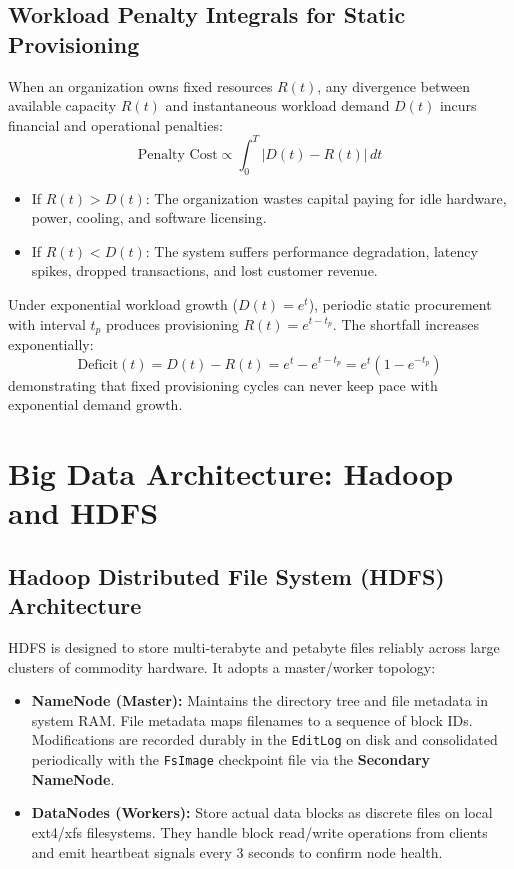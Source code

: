 \documentclass[11pt,a4paper,openany]{report}
\begin{document}
\subsection{Workload Penalty Integrals for Static Provisioning}
When an organization owns fixed resources $R(t)$, any divergence between available capacity $R(t)$ and instantaneous workload demand $D(t)$ incurs financial and operational penalties:
\begin{equation}
\text{Penalty Cost} \propto \int_{0}^{T} |D(t) - R(t)|\, dt
\end{equation}
\begin{itemize}[leftmargin=*]
  \item If $R(t) > D(t)$: The organization wastes capital paying for idle hardware, power, cooling, and software licensing.
  \item If $R(t) < D(t)$: The system suffers performance degradation, latency spikes, dropped transactions, and lost customer revenue.
\end{itemize}

Under exponential workload growth ($D(t) = e^t$), periodic static procurement with interval $t_p$ produces provisioning $R(t) = e^{t - t_p}$. The shortfall increases exponentially:
\begin{equation}
\text{Deficit}(t) = D(t) - R(t) = e^t - e^{t - t_p} = e^t (1 - e^{-t_p})
\end{equation}
demonstrating that fixed provisioning cycles can never keep pace with exponential demand growth.

\section{Big Data Architecture: Hadoop and HDFS}
\subsection{Hadoop Distributed File System (HDFS) Architecture}
HDFS is designed to store multi-terabyte and petabyte files reliably across large clusters of commodity hardware. It adopts a master/worker topology:
\begin{itemize}[leftmargin=*]
  \item \textbf{NameNode (Master):} Maintains the directory tree and file metadata in system RAM. File metadata maps filenames to a sequence of block IDs. Modifications are recorded durably in the \texttt{EditLog} on disk and consolidated periodically with the \texttt{FsImage} checkpoint file via the \textbf{Secondary NameNode}.
  \item \textbf{DataNodes (Workers):} Store actual data blocks as discrete files on local ext4/xfs filesystems. They handle block read/write operations from clients and emit heartbeat signals every 3 seconds to confirm node health.
\end{itemize}
\end{document}
